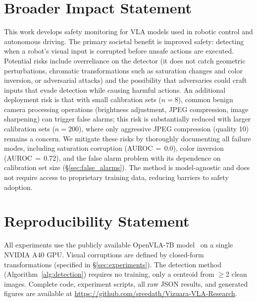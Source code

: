 \documentclass[11pt]{article}
\begin{document}
\section*{Broader Impact Statement}

This work develops safety monitoring for VLA models used in robotic control and autonomous driving.
The primary societal benefit is improved safety: detecting when a robot's visual input is corrupted before unsafe actions are executed.
Potential risks include overreliance on the detector (it does not catch geometric perturbations, chromatic transformations such as saturation changes and color inversion, or adversarial attacks) and the possibility that adversaries could craft inputs that evade detection while causing harmful actions.
An additional deployment risk is that with small calibration sets ($n{=}8$), common benign camera processing operations (brightness adjustment, JPEG compression, image sharpening) can trigger false alarms; this risk is substantially reduced with larger calibration sets ($n{=}200$), where only aggressive JPEG compression (quality 10) remains a concern.
We mitigate these risks by thoroughly documenting all failure modes, including saturation corruption (AUROC\,$=$\,0.0), color inversion (AUROC\,$=$\,0.72), and the false alarm problem with its dependence on calibration set size (\S\ref{sec:false_alarms}).
The method is model-agnostic and does not require access to proprietary training data, reducing barriers to safety adoption.

\section*{Reproducibility Statement}

All experiments use the publicly available OpenVLA-7B model~\cite{kim2024openvla} on a single NVIDIA A40 GPU.
Visual corruptions are defined by closed-form transformations (specified in \S\ref{sec:experiments}).
The detection method (Algorithm~\ref{alg:detection}) requires no training, only a centroid from $\geq$2 clean images.
Complete code, experiment scripts, all raw JSON results, and generated figures are available at \url{https://github.com/sreedath/Vizuara-VLA-Research}.
\end{document}
